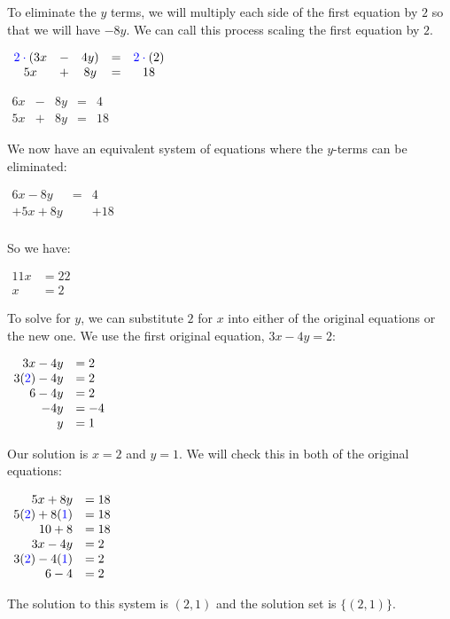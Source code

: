 \documentclass[nooutcomes]{ximera}
\begin{document}
\begin{example}
\begin{explanation}
 To eliminate the $y$ terms,
          we will multiply each side of the first equation by $2$ so that we will have $-8y$.
          We can call this process scaling
          the first equation by $2$.
\begin{center}
$
            \begin{array}{ccccc}
            {\color{blue}{{2\cdot{}}}}(3x& - & 4y) & = & {\color{blue}{{2\cdot{}}}}(2) \\
            5x& + & 8y & = & 18
            \end{array}
$
\end{center}
\begin{center}
 $        
            \begin{array}{ccccc}
            6x& - & 8y & = & 4 \\
            5x& + & 8y & = & 18
            \end{array}
  $
\end{center}
 We now have an equivalent system of equations where the $y$-terms can be eliminated:
\begin{center}
$\begin{array}{rcl}
6x-8y &= & 4\\
+5x+8y& &+18\\
\end{array}
$
\end{center}
            So we have:
\begin{center}
$\begin{array}{rl}
            11x&=22\\
x&=2
\end{array}
$
\end{center}
To solve for $y$,
          we can substitute $2$ for $x$ into either of the original equations or the new one.
          We use the first original equation, $3x-4y=2$:
\begin{center}
$
\begin{array}{rl}
 3x-4y&=2\\
            3({\color{blue}{{2}}})-4y&=2\\
            6-4y&=2\\
            -4y&=-4\\
            y&=1
\end{array}
$
\end{center}
 Our solution is $x=2$ and $y=1$.
          We will check this in both of the original equations:
\begin{center}
$
\begin{array}{rl}
5x+8y&=18\\
            5({\color{blue}{{2}}})+8({\color{blue}{{1}}})&=18\\
            10+8&=18\\
  3x-4y&=2\\
3({\color{blue}{{2}}})-4({\color{blue}{{1}}})&=2\\
 6-4&=2
\end{array}
$
\end{center}
The solution to this system is $(2,1)$ and the solution set is $\{(2,1)\}$.
\end{explanation}
\end{example}
\end{document}

